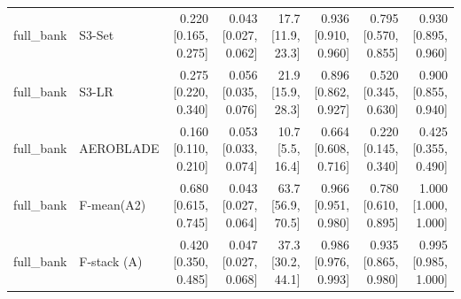 \begin{table}[htbp]
\begin{tabular}{llrrrrrr}
full\_bank & S3-Set & 0.220 [0.165, 0.275] & 0.043 [0.027, 0.062] & 17.7 [11.9, 23.3] & 0.936 [0.910, 0.960] & 0.795 [0.570, 0.855] & 0.930 [0.895, 0.960] \\
full\_bank & S3-LR & 0.275 [0.220, 0.340] & 0.056 [0.035, 0.076] & 21.9 [15.9, 28.3] & 0.896 [0.862, 0.927] & 0.520 [0.345, 0.630] & 0.900 [0.855, 0.940] \\
full\_bank & AEROBLADE & 0.160 [0.110, 0.210] & 0.053 [0.033, 0.074] & 10.7 [5.5, 16.4] & 0.664 [0.608, 0.716] & 0.220 [0.145, 0.340] & 0.425 [0.355, 0.490] \\
full\_bank & F-mean(A2) & 0.680 [0.615, 0.745] & 0.043 [0.027, 0.064] & 63.7 [56.9, 70.5] & 0.966 [0.951, 0.980] & 0.780 [0.610, 0.895] & 1.000 [1.000, 1.000] \\
full\_bank & F-stack (A) & 0.420 [0.350, 0.485] & 0.047 [0.027, 0.068] & 37.3 [30.2, 44.1] & 0.986 [0.976, 0.993] & 0.935 [0.865, 0.980] & 0.995 [0.985, 1.000] \\
\bottomrule
\end{tabular}
\end{table}
